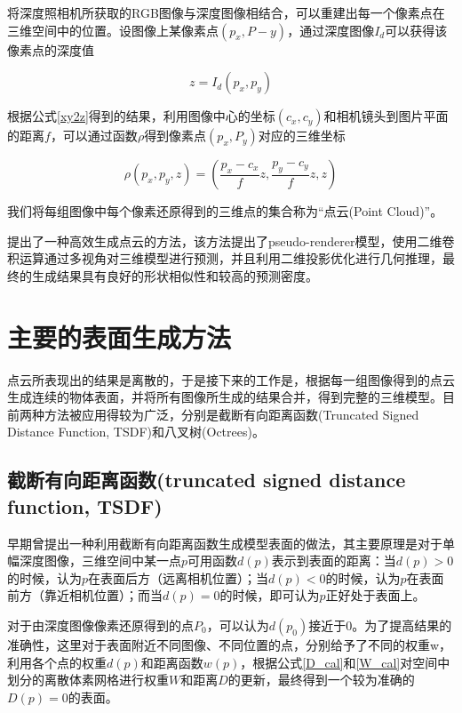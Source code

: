 \documentclass{llncs}
\begin{document}
\begin{CJK}{UTF8}{song}
将深度照相机所获取的RGB图像与深度图像相结合，可以重建出每一个像素点在三维空间中的位置。设图像上某像素点$(p_x,P-y)$，通过深度图像$I_d$可以获得该像素点的深度值

\begin{equation}
\label{xy2z}
	z = I_d(p_x,p_y)
\end{equation}

根据公式\ref{xy2z}得到的结果，利用图像中心的坐标$(c_x,c_y)$和相机镜头到图片平面的距离$f$，可以通过函数$\rho$得到像素点$(p_x,P_y)$对应的三维坐标

\begin{equation}
\label{get3dpoint}
	\rho(p_x,p_y,z) = (\frac{p_x-c_x}{f}z,\frac{p_y-c_y}{f}z,z)
\end{equation}

我们将每组图像中每个像素还原得到的三维点的集合称为“点云(Point Cloud)”。

\cite{DBLP:conf/aaai/LinKL18}提出了一种高效生成点云的方法，该方法提出了pseudo-renderer模型，使用二维卷积运算通过多视角对三维模型进行预测，并且利用二维投影优化进行几何推理，最终的生成结果具有良好的形状相似性和较高的预测密度。


\section{主要的表面生成方法}

点云所表现出的结果是离散的，于是接下来的工作是，根据每一组图像得到的点云生成连续的物体表面，并将所有图像所生成的结果合并，得到完整的三维模型。目前两种方法被应用得较为广泛，分别是截断有向距离函数(Truncated Signed Distance Function, TSDF)和八叉树(Octrees)。

	\subsection{截断有向距离函数(truncated signed distance function, TSDF)}

早期曾提出一种利用截断有向距离函数生成模型表面的做法\cite{DBLP:conf/siggraph/CurlessL96}，其主要原理是对于单幅深度图像，三维空间中某一点$p$可用函数$d(p)$表示到表面的距离：当$d(p)>0$的时候，认为$p$在表面后方（远离相机位置）；当$d(p)<0$的时候，认为$p$在表面前方（靠近相机位置）；而当$d(p)=0$的时候，即可认为$p$正好处于表面上。

对于由深度图像像素还原得到的点$P_0$，可以认为$d(p_0)$接近于0。为了提高结果的准确性，这里对于表面附近不同图像、不同位置的点，分别给予了不同的权重w，利用各个点的权重$d(p)$和距离函数$w(p)$，根据公式\ref{D_cal}和\ref{W_cal}对空间中划分的离散体素网格进行权重$W$和距离$D$的更新，最终得到一个较为准确的$D(p)=0$的表面。


\end{CJK}
\end{document}
